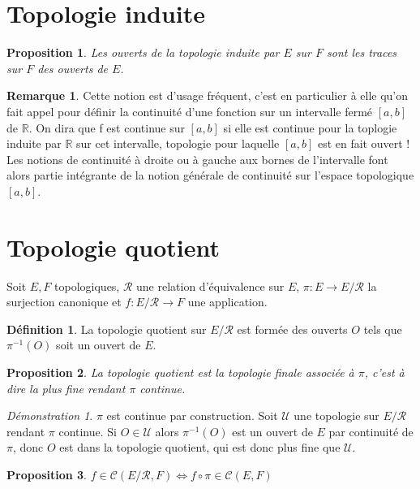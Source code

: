 \documentclass[a4paper, 11pt, french]{book}
\theoremstyle{plain} %
\newtheorem{proposition}{Proposition}
\theoremstyle{definition} %
\newtheorem{definition}{Définition}
\newtheorem{remarque}{Remarque}
\theoremstyle{remark} %
\newtheorem*{demonstration}{Démonstration}
\newcommand{\1}{\mathds{1}}
\newcommand{\cont}{\mathcal{C}}
\newcommand{\inv}[1]{#1^{-1}}
\newcommand{\R}{\mathbb{R}}
\begin{document}
\section{Topologie induite}

\begin{proposition}
	Les ouverts de la topologie induite par $E$ sur $F$ sont les traces sur $F$ des ouverts de $E$.
\end{proposition}

\begin{remarque}
	Cette notion est d’usage fréquent, c’est en particulier à elle qu’on fait appel pour définir la continuité d’une fonction sur un intervalle fermé $[a, b]$ de $\R$.
	On dira que f est continue sur $[a, b]$ si elle est continue pour la toplogie induite par $\R$ sur cet intervalle, topologie pour laquelle $[a, b]$ est en fait ouvert !
	Les notions de continuité à droite ou à gauche aux bornes de l’intervalle font alors partie intégrante de la notion générale de continuité sur l’espace topologique $[a, b]$.
\end{remarque}

\section{Topologie quotient}
Soit $E, F$ topologiques, $\mathcal{R}$ une relation d’équivalence sur $E$, $\pi\colon E\rightarrow E/\mathcal{R}$ la surjection canonique et $f\colon E/\mathcal{R}\rightarrow F$ une application.

\begin{definition}
	La topologie quotient sur $E/\mathcal{R}$ est formée des ouverts $O$ tels que $\inv{\pi}(O)$ soit un ouvert de $E$.
\end{definition}

\begin{proposition}
	La topologie quotient est la topologie finale associée à $\pi$, c'est à dire la plus fine rendant $\pi$ continue.
\end{proposition}

\begin{demonstration}
	$\pi$ est continue par construction.
	Soit $\mathscr{U}$ une topologie sur $E/\mathcal{R}$ rendant $\pi$ continue.
	Si $O\in\mathscr{U}$ alors $\inv{\pi}(O)$ est un ouvert de $E$ par continuité de $\pi$, donc $O$ est dans la topologie quotient, qui est donc plus fine que $\mathscr{U}$.
\end{demonstration}

\begin{proposition}
	$f\in\cont(E/\mathcal{R}, F)\iff f\circ\pi\in\cont(E, F)$
\end{proposition}
\end{document}
